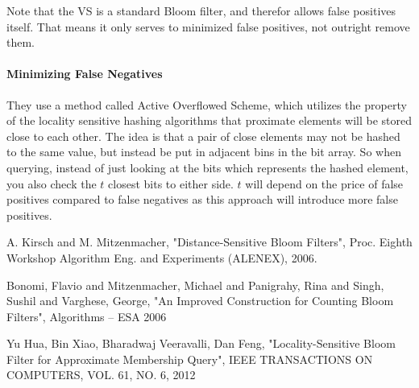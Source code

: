 \documentclass[a4paper,11pt]{article}
\begin{document}
Note that the VS is a standard Bloom filter, and therefor allows false positives itself. That means it only serves to minimized false positives, not outright remove them.

\paragraph{Minimizing False Negatives}
They use a method called Active Overflowed Scheme, which utilizes the property of the locality sensitive hashing algorithms that proximate elements will be stored close to each other. The idea is that a pair of close elements may not be hashed to the same value, but instead be put in adjacent bins in the bit array. So when querying, instead of just looking at the bits which represents the hashed element, you also check the $t$ closest bits to either side. $t$ will depend on the price of false positives compared to false negatives as this approach will introduce more false positives.

\begin{thebibliography}{}

A. Kirsch and M. Mitzenmacher, "Distance-Sensitive Bloom Filters", Proc. Eighth Workshop Algorithm Eng. and Experiments (ALENEX), 2006.

Bonomi, Flavio and Mitzenmacher, Michael and Panigrahy, Rina and Singh, Sushil and Varghese, George, "An Improved Construction for Counting Bloom Filters", Algorithms – ESA 2006 

Yu Hua, Bin Xiao, Bharadwaj Veeravalli, Dan Feng, "Locality-Sensitive Bloom Filter for Approximate Membership Query", IEEE TRANSACTIONS ON COMPUTERS, VOL. 61, NO. 6, 2012
 
\end{thebibliography}
\end{document}
